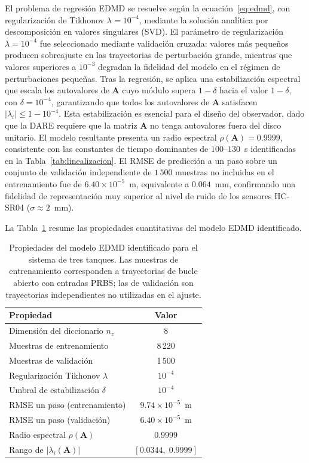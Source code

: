 \documentclass[12pt,letterpaper]{article}
\begin{document}
El problema de regresión EDMD se resuelve según la 
ecuación~\eqref{eq:edmd}, con regularización de Tikhonov 
$\lambda = 10^{-4}$, mediante la solución analítica por descomposición en 
valores singulares (SVD). El parámetro de regularización $\lambda = 
10^{-4}$ fue seleccionado mediante validación cruzada: valores más 
pequeños producen sobreajuste en las trayectorias de perturbación grande, 
mientras que valores superiores a $10^{-3}$ degradan la fidelidad del 
modelo en el régimen de perturbaciones pequeñas. Tras la regresión, se 
aplica una estabilización espectral que escala los autovalores de 
$\mathbf{A}$ cuyo módulo supera $1 - \delta$ hacia el valor $1 - \delta$, 
con $\delta = 10^{-4}$, garantizando que todos los autovalores de 
$\mathbf{A}$ satisfacen $|\lambda_i| \leq 1 - 10^{-4}$. Esta 
estabilización es esencial para el diseño del observador, dado que la 
DARE requiere que la matriz $\mathbf{A}$ no tenga autovalores fuera del 
disco unitario. El modelo resultante presenta un radio espectral 
$\rho(\mathbf{A}) = 0.9999$, consistente con las constantes de tiempo 
dominantes de $100$--$130$~s identificadas en la 
Tabla~\ref{tab:linealizacion}. El RMSE de predicción a un paso sobre un 
conjunto de validación independiente de $1\,500$ muestras no incluidas en 
el entrenamiento fue de $6.40 \times 10^{-5}$~m, equivalente a $0.064$~mm, 
confirmando una fidelidad de representación muy superior al nivel de ruido
de los sensores HC-SR04 ($\sigma \approx 2$~mm).

La Tabla~\ref{tab:edmd_props} resume las propiedades cuantitativas del
modelo EDMD identificado.

\begin{table}[H]
\centering
\caption{Propiedades del modelo EDMD identificado para el sistema de
tres tanques. Las muestras de entrenamiento corresponden a trayectorias
de bucle abierto con entradas PRBS; las de validación son trayectorias
independientes no utilizadas en el ajuste.}
\label{tab:edmd_props}
\begin{tabular}{lc}
\toprule
\textbf{Propiedad} & \textbf{Valor} \\
\midrule
Dimensión del diccionario $n_z$ & 8 \\
Muestras de entrenamiento & 8\,220 \\
Muestras de validación & 1\,500 \\
Regularización Tikhonov $\lambda$ & $10^{-4}$ \\
Umbral de estabilización $\delta$ & $10^{-4}$ \\
RMSE un paso (entrenamiento) & $9.74 \times 10^{-5}$~m \\
RMSE un paso (validación) & $6.40 \times 10^{-5}$~m \\
Radio espectral $\rho(\mathbf{A})$ & $0.9999$ \\
Rango de $|\lambda_i(\mathbf{A})|$ & $[0.0344,\;0.9999]$ \\
\bottomrule
\end{tabular}
\end{table}
\end{document}
